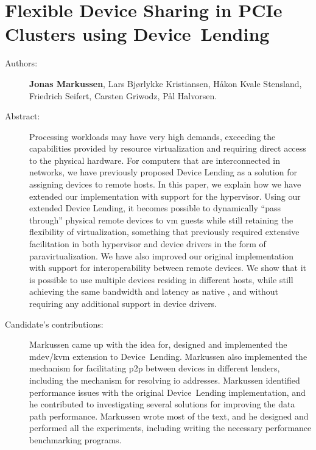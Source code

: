 \chapter{Flexible Device Sharing in PCIe Clusters using Device~Lending}
\label{paper:srmpds}
\paperthumb

\begin{description}
	\item[Authors:]
		\textbf{Jonas Markussen}, Lars Bj{\o}rlykke Kristiansen, H{\aa}kon Kvale Stensland,
		Friedrich Seifert, Carsten Griwodz, P{\aa}l Halvorsen.

	\item[Abstract:]
		Processing workloads may have very high  demands, exceeding the capabilities provided by resource
		virtualization and requiring direct access to the physical hardware.
		For computers that are interconnected in  networks, we have previously proposed 
		Device Lending as a solution for assigning devices to remote hosts. In this paper, we
		explain how we have extended our implementation with support for the  \gls{hypervisor}.
		Using our extended Device Lending, it becomes possible to dynamically ``pass through'' physical remote devices
		to \acrshort{vm} guests while still retaining the flexibility of virtualization, something that previously required
		extensive facilitation in both \gls{hypervisor} and device drivers in the form of \gls{paravirtualization}.
		We have also improved our original implementation with support for interoperability between remote devices.
		We show that it is possible to use multiple devices residing in different hosts, while still achieving the same
		bandwidth and latency as native , and without requiring any additional support in device drivers. 


	\item[Candidate's contributions:]
		Markussen came up with the idea for, designed and implemented the \acrshort{mdev}/\acrshort{kvm} extension to Device~Lending.
		Markussen also implemented the mechanism for facilitating \acrshort{p2p} between devices in different lenders,
		including the mechanism for resolving \gls{io} addresses.
		Markussen identified performance issues with the original Device~Lending implementation, 
		and he contributed to investigating several solutions for improving the data path performance.
		Markussen wrote most of the text, and he designed and performed all the experiments, including writing the necessary performance benchmarking programs.


\end{description}
